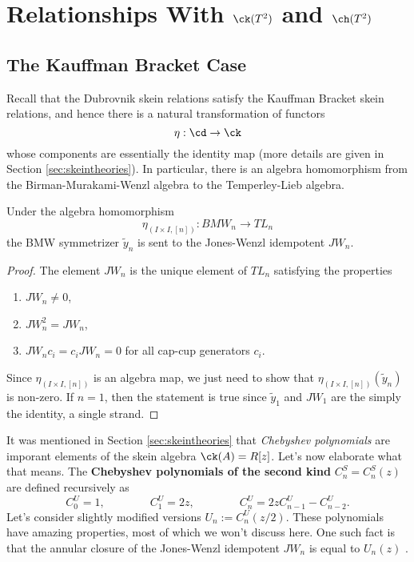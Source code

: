 \section{Relationships With $\ck(T^2)$ and $\ch(T^2)$}

\subsection{The Kauffman Bracket Case}

Recall that the Dubrovnik skein relations satisfy the Kauffman Bracket skein relations, and hence there is a natural transformation of functors
\[
\eta: \cd \to \ck
\]
whose components are essentially the identity map (more details are given in Section \ref{sec:skeintheories}). In particular, there is an algebra homomorphism from the Birman-Murakami-Wenzl algebra to the Temperley-Lieb algebra.

\begin{lemma}
Under the algebra homomorphism
\[
\eta_{(I \times I, [n])}: BMW_n \to TL_n
\]
the BMW symmetrizer $\tilde{y}_n$ is sent to the Jones-Wenzl idempotent $JW_n$.
\end{lemma}
\begin{proof}
The element $JW_n$ is the unique element of $TL_n$ satisfying the properties
\begin{enumerate}
\item $JW_n \neq 0$,
\item $JW_n^2 = JW_n$,
\item $JW_n c_i = c_i JW_n = 0$ for all cap-cup generators $c_i$. 
\end{enumerate}
Since $\eta_{(I \times I, [n])}$ is an algebra map, we just need to show that $\eta_{(I \times I, [n])}(\tilde{y}_n)$ is non-zero. If $n=1$, then the statement is true since $\tilde{y}_1$ and $JW_1$ are the simply the identity, a single strand. 
 
\end{proof}

It was mentioned in Section \ref{sec:skeintheories} that \textit{Chebyshev polynomials} are imporant elements of the skein algebra $\ck(A) = R[z]$. Let's now elaborate what that means. The 
\textbf{Chebyshev polynomials of the second kind} $C^S_n = C^S_n(z)$ are defined recursively as
\[
C^U_0 = 1, \qquad \qquad C^U_1 = 2z, \qquad \qquad C^U_n = 2 z C^U_{n-1} - C^U_{n-2}.
\]
Let's consider slightly modified versions $U_n := C_n^U(z/2)$. These polynomials have amazing properties, most of which we won't discuss here. One such fact is that the annular closure of the Jones-Wenzl idempotent $JW_n$ is equal to $U_n(z)$ . 

